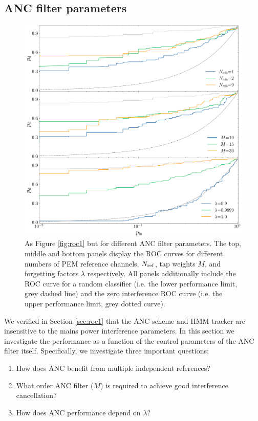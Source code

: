 \documentclass[pra,superscriptaddress,reprint,amsmath,amssymb,nofootinbib]{revtex4-2}
\begin{document}
\subsection{ANC filter parameters} \label{sec:roc2}
\begin{figure}
	\begin{center}
		\includegraphics[width=\columnwidth]{images/roc_curve_filter_params_log}
	\end{center}
	\caption{As Figure \ref{fig:roc1} but for different ANC filter parameters. The top, middle and bottom panels display the ROC curves for different numbers of PEM reference channels, $N_{\rm ref}$, tap weights $M$, and forgetting factors $\lambda$ respectively. All panels additionally include the ROC curve for a random classifier (i.e. the lower performance limit, grey dashed line) and the zero interference ROC curve (i.e. the upper performance limit, grey dotted curve).}
	\label{fig:roc2}
\end{figure}
We verified in Section \ref{sec:roc1} that the ANC scheme and HMM tracker are insensitive to the mains power interference parameters. In this section we investigate the performance as a function of the control parameters of the ANC filter itself. Specifically, we investigate three important questions:
\begin{enumerate}
	\item How does ANC benefit from multiple independent references?
	\item What order ANC filter ($M$) is required to achieve good interference cancellation? 
	\item How does ANC performance depend on $\lambda$?
\end{enumerate} 
\end{document}

